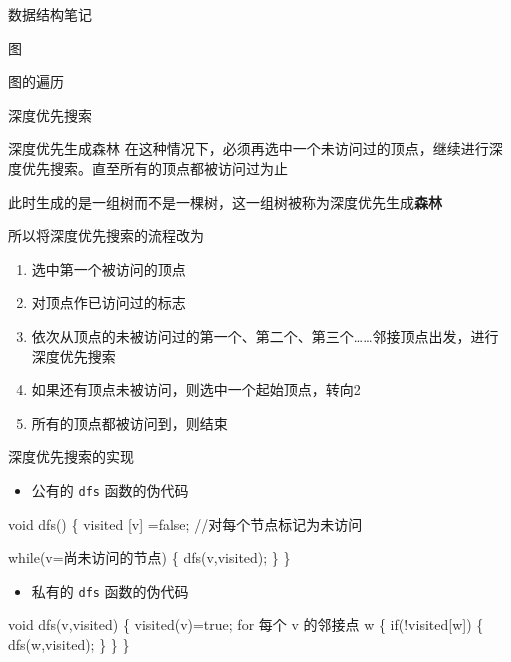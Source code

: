 \documentclass[
  ignorenonframetext,
]{beamer}
\newenvironment{Shaded}{}{}
\newcommand{\NormalTok}[1]{#1}
\providecommand{\tightlist}{%
  \setlength{\itemsep}{0pt}\setlength{\parskip}{0pt}}
\begin{document}
\begin{frame}[fragile]{数据结构笔记}
\begin{block}{图}
\begin{block}{图的遍历}
\begin{block}{深度优先搜索}
\begin{block}{深度优先生成森林}
\protect{}\label{ux6df1ux5ea6ux4f18ux5148ux751fux6210ux68eeux6797}
在这种情况下，必须再选中一个未访问过的顶点，继续进行深度优先搜索。直至所有的顶点都被访问过为止

此时生成的是一组树而不是一棵树，这一组树被称为深度优先生成\textbf{森林}

所以将深度优先搜索的流程改为

\begin{enumerate}
\tightlist
\item
  选中第一个被访问的顶点
\item
  对顶点作已访问过的标志
\item
  依次从顶点的未被访问过的第一个、第二个、第三个\ldots\ldots 邻接顶点出发，进行深度优先搜索
\item
  如果还有顶点未被访问，则选中一个起始顶点，转向2
\item
  所有的顶点都被访问到，则结束
\end{enumerate}
\end{block}

\begin{block}{深度优先搜索的实现}
\protect{}\label{ux6df1ux5ea6ux4f18ux5148ux641cux7d22ux7684ux5b9eux73b0}
\begin{itemize}
\tightlist
\item
  公有的 \texttt{dfs} 函数的伪代码
\end{itemize}

\begin{Shaded}
\begin{Highlighting}[]
\NormalTok{void dfs()}
\NormalTok{\{}
\NormalTok{  visited [v] =false; //对每个节点标记为未访问}

\NormalTok{  while(v=尚未访问的节点)}
\NormalTok{  \{}
\NormalTok{    dfs(v,visited);}
\NormalTok{  \}}
\NormalTok{\}}
\end{Highlighting}
\end{Shaded}

\begin{itemize}
\tightlist
\item
  私有的 \texttt{dfs} 函数的伪代码
\end{itemize}

\begin{Shaded}
\begin{Highlighting}[]
\NormalTok{void dfs(v,visited)}
\NormalTok{\{}
\NormalTok{  visited(v)=true;}
\NormalTok{  for 每个 v 的邻接点 w}
\NormalTok{  \{}
\NormalTok{    if(!visited[w])}
\NormalTok{    \{}
\NormalTok{      dfs(w,visited);}
\NormalTok{    \}}
\NormalTok{  \}}
\NormalTok{\}}
\end{Highlighting}
\end{Shaded}
\end{block}
\end{block}


\end{block}
\end{block}
\end{frame}
\end{document}
